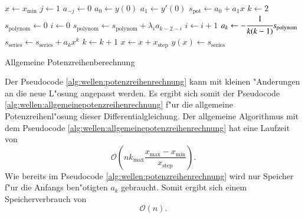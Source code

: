 \begin{algorithm}
	\begin{algorithmic}[1]
		\State $x \gets x_{\text{min}}$
			\State $j \gets 1$
				\State $a_{-j} \gets 0$
			\EndFor
			\State $a_0 \gets y(0)$
			\State $a_1 \gets y'(0)$
			\State $s_{\text{pot}} \gets a_0 + a_1x$
			\State $k \gets 2$
				\State $s_{\text{polynom}} \gets 0$
				\State $i \gets 0$
					\State $s_{\text{polynom}} \gets 
					s_{\text{polynom}}+\lambda_i a_{k-2-i}$
					\State $i \gets i + 1$
				\EndFor
				\State $a_k \gets -\cfrac{1}{k(k-1)} s_{\text{polynom}}$
				\State $s_{\text{series}} \gets s_{\text{series}} + 
				a_k x^k$
				\State $k \gets k + 1$
			\EndFor
		\State $x \gets x + x_{\text{step}}$
		\State $y(x) \gets s_{\text{series}}$
		\EndFor
	\end{algorithmic}
	
	\caption{Allgemeine Potenzreihenberechnung} 
	\label{alg:wellen:allgemeinepotenzreihenrechnung}
\end{algorithm}

Der Pseudocode \ref{alg:wellen:potenzreihenrechnung} kann mit kleinen 
"Anderungen an die neue L"osung angepasst werden. Es ergibt sich somit der 
Pseudocode \ref{alg:wellen:allgemeinepotenzreihenrechnung} f"ur die allgemeine 
Potenzreihenl"osung dieser Differentialgleichung. Der allgemeine Algorithmus 
mit dem Pseudocode \ref{alg:wellen:allgemeinepotenzreihenrechnung} hat eine 
Laufzeit von
\begin{equation*}
	\mathcal{O}
	\left(
		nk_{\text{max}}\frac{x_{\text{max}}-x_{\text{min}}}{x_{\text{step}}}
	\right).
\end{equation*}
Wie bereits im Pseudocode \ref{alg:wellen:potenzreihenrechnung} wird nur 
Speicher f"ur die Anfangs ben"otigten $a_k$ gebraucht. Somit ergibt sich einem 
Speicherverbrauch von
\begin{equation*}
	\mathcal{O}
	\left(
		n
	\right).
\end{equation*}
